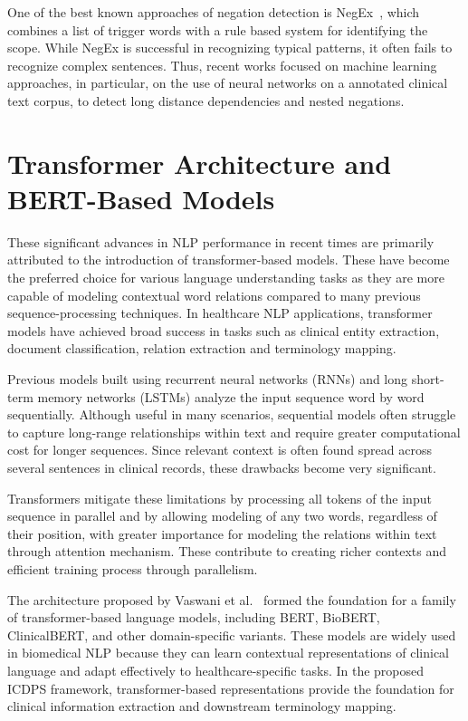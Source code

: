 One of the best known approaches of negation detection is NegEx~\cite{ref14}, which combines a list of trigger words with a rule based system for identifying the scope. While NegEx is successful in recognizing typical patterns, it often fails to recognize complex sentences. Thus, recent works focused on machine learning approaches, in particular, on the use of neural networks on a annotated clinical text corpus, to detect long distance dependencies and nested negations.

\section{Transformer Architecture and BERT-Based Models}

These significant advances in NLP performance in recent times are primarily attributed to the introduction of transformer-based models. These have become the preferred choice for various language understanding tasks as they are more capable of modeling contextual word relations compared to many previous sequence-processing techniques. In healthcare NLP applications, transformer models have achieved broad success in tasks such as clinical entity extraction, document classification, relation extraction and terminology mapping.

Previous models built using recurrent neural networks (RNNs) and long short-term memory networks (LSTMs) analyze the input sequence word by word sequentially. Although useful in many scenarios, sequential models often struggle to capture long-range relationships within text and require greater computational cost for longer sequences. Since relevant context is often found spread across several sentences in clinical records, these drawbacks become very significant.

Transformers mitigate these limitations by processing all tokens of the input sequence in parallel and by allowing modeling of any two words, regardless of their position, with greater importance for modeling the relations within text through attention mechanism. These contribute to creating richer contexts and efficient training process through parallelism.

The architecture proposed by Vaswani et al.~\cite{ref76} formed the foundation for a family of transformer-based language models, including BERT, BioBERT, ClinicalBERT, and other domain-specific variants. These models are widely used in biomedical NLP because they can learn contextual representations of clinical language and adapt effectively to healthcare-specific tasks. In the proposed ICDPS framework, transformer-based representations provide the foundation for clinical information extraction and downstream terminology mapping.

